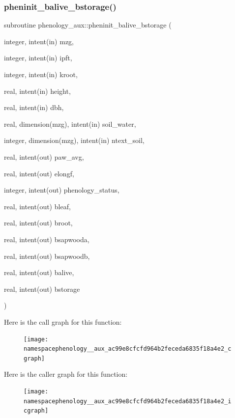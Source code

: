 \subsubsection{\texorpdfstring{pheninit\+\_\+balive\+\_\+bstorage()}{pheninit\_balive\_bstorage()}}
{\footnotesize\ttfamily subroutine phenology\+\_\+aux\+::pheninit\+\_\+balive\+\_\+bstorage (\begin{DoxyParamCaption}\item[{integer, intent(in)}]{mzg,  }\item[{integer, intent(in)}]{ipft,  }\item[{integer, intent(in)}]{kroot,  }\item[{real, intent(in)}]{height,  }\item[{real, intent(in)}]{dbh,  }\item[{real, dimension(mzg), intent(in)}]{soil\+\_\+water,  }\item[{integer, dimension(mzg), intent(in)}]{ntext\+\_\+soil,  }\item[{real, intent(out)}]{paw\+\_\+avg,  }\item[{real, intent(out)}]{elongf,  }\item[{integer, intent(out)}]{phenology\+\_\+status,  }\item[{real, intent(out)}]{bleaf,  }\item[{real, intent(out)}]{broot,  }\item[{real, intent(out)}]{bsapwooda,  }\item[{real, intent(out)}]{bsapwoodb,  }\item[{real, intent(out)}]{balive,  }\item[{real, intent(out)}]{bstorage }\end{DoxyParamCaption})}

Here is the call graph for this function\+:
\nopagebreak
\begin{figure}[H]
\begin{center}
\leavevmode
\texttt{[image: namespacephenology\_\_aux\_ac99e8cfcfd964b2feceda6835f18a4e2\_cgraph]}
\end{center}
\end{figure}
Here is the caller graph for this function\+:
\nopagebreak
\begin{figure}[H]
\begin{center}
\leavevmode
\texttt{[image: namespacephenology\_\_aux\_ac99e8cfcfd964b2feceda6835f18a4e2\_icgraph]}
\end{center}
\end{figure}
\mbox{\label{namespacephenology__aux_aac80b26fc41e788ad7669441222543ff}} 
